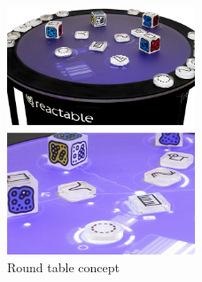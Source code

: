 \begin{figure}[H]
	\centering
   	\includegraphics[width=0.5\textwidth]{images/ReacTable-instrument-detail1}
    \caption{Round table concept \cite{concept2}}
\end{figure}
